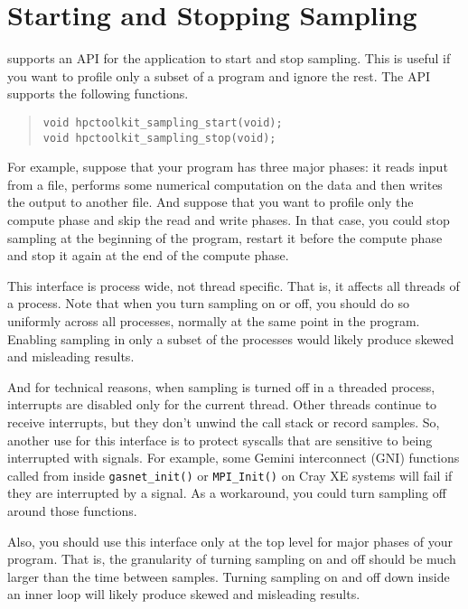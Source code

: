 \section{Starting and Stopping Sampling}

\HPCToolkit{} supports an API for the application to start and stop
sampling.  This is useful if you want to profile only a subset of a
program and ignore the rest.  The API supports the following
functions.

\begin{quote}
\begin{verbatim}
void hpctoolkit_sampling_start(void);
void hpctoolkit_sampling_stop(void);
\end{verbatim}
\end{quote}

For example, suppose that your program has three major phases: it
reads input from a file, performs some numerical computation on the
data and then writes the output to another file.  And suppose that you
want to profile only the compute phase and skip the read and write
phases.  In that case, you could stop sampling at the beginning of the
program, restart it before the compute phase and stop it again at the
end of the compute phase.

This interface is process wide, not thread specific.  That is, it
affects all threads of a process.  Note that when you turn sampling on
or off, you should do so uniformly across all processes, normally at
the same point in the program.  Enabling sampling in only a subset of
the processes would likely produce skewed and misleading results.

And for technical reasons, when sampling is turned off in a threaded
process, interrupts are disabled only for the current thread.  Other
threads continue to receive interrupts, but they don't unwind the call
stack or record samples.  So, another use for this interface is to
protect syscalls that are sensitive to being interrupted with signals.
For example, some Gemini interconnect (GNI) functions called from
inside \verb|gasnet_init()| or \verb|MPI_Init()| on Cray XE systems
will fail if they are interrupted by a signal.  As a workaround, you
could turn sampling off around those functions.

Also, you should use this interface only at the top level for major
phases of your program.  That is, the granularity of turning sampling
on and off should be much larger than the time between samples.
Turning sampling on and off down inside an inner loop will likely
produce skewed and misleading results.

